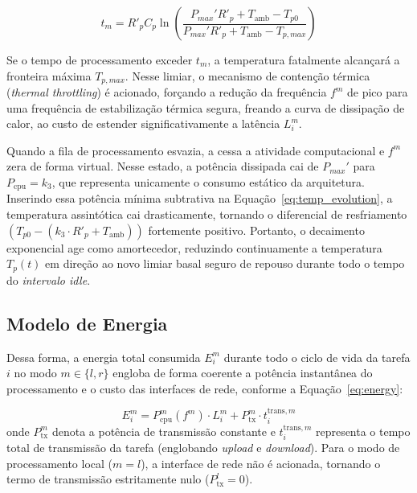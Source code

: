 \begin{equation}
\label{eq:thermal_throttling}
t_m = R'_p C_p \ln\left(\frac{P_{max}' R'_p + T_{\mathrm{amb}} - T_{p0}}{P_{max}' R'_p + T_{\mathrm{amb}} - T_{p,max}}\right)
\end{equation}

Se o tempo de processamento exceder $t_m$, a temperatura fatalmente alcançará a fronteira máxima $T_{p,max}$. Nesse limiar, o mecanismo de contenção térmica (\textit{thermal throttling}) é acionado, forçando a redução da frequência $f^m$ de pico para uma frequência de estabilização térmica segura, freando a curva de dissipação de calor, ao custo de estender significativamente a latência $L_i^m$.

Quando a fila de processamento esvazia, a  cessa a atividade computacional e $f^m$ zera de forma virtual. Nesse estado, a potência dissipada cai de $P_{max}'$ para $P_{\mathrm{cpu}} = k_3$, que representa unicamente o consumo estático da arquitetura. Inserindo essa potência mínima subtrativa na Equação~\ref{eq:temp_evolution}, a temperatura assintótica cai drasticamente, tornando o diferencial de resfriamento $(T_{p0} - (k_3 \cdot R'_p + T_{\mathrm{amb}}))$ fortemente positivo. Portanto, o decaimento exponencial age como amortecedor, reduzindo continuamente a temperatura $T_p(t)$ em direção ao novo limiar basal seguro de repouso durante todo o tempo do \textit{intervalo idle}.


\subsection{Modelo de Energia}


Dessa forma, a energia total consumida $E_i^m$ durante todo o ciclo de vida da tarefa $i$ no modo $m \in \{l, r\}$ engloba de forma coerente a potência instantânea do processamento e o custo das interfaces de rede, conforme a Equação~\ref{eq:energy}:

\begin{equation}
\label{eq:energy}
E_i^m = P_{\mathrm{cpu}}^m(f^m) \cdot L_i^m + P_{\mathrm{tx}}^m \cdot t_i^{\mathrm{trans},m}
\end{equation}
onde $P_{\mathrm{tx}}^m$ denota a potência de transmissão constante e $t_i^{\mathrm{trans},m}$ representa o tempo total de transmissão da tarefa (englobando \textit{upload} e \textit{download}). Para o modo de processamento local ($m=l$), a interface de rede não é acionada, tornando o termo de transmissão estritamente nulo ($P_{\mathrm{tx}}^l = 0$).


